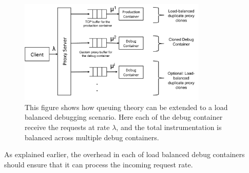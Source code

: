 \begin{figure}[h!]
	\begin{center}
		\includegraphics[width=0.8\textwidth]{queue/figs/queueBalanced.pdf}
		\caption{This figure shows how queuing theory can be extended to a load balanced debugging scenario. Here each of the debug container receive the requests at rate $\lambda$, and the total instrumentation is balanced across multiple debug containers.}
		\label{fig:queueBalanced}
	\end{center}
\end{figure}

As explained earlier, the overhead in each of load balanced debug containers should ensure that it can process the incoming request rate. 

